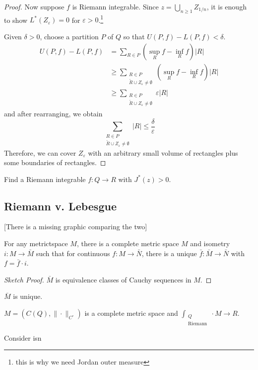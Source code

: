 \begin{proof}
  Now suppose $f$ is Riemann integrable. Since $z = \bigcup_{n \geq 1} Z_{1/n}$, it is enough to show $L^*(Z_\varepsilon) = 0$ for $\varepsilon > 0$.\footnote{this is why we need Jordan outer measure}

  Given $\delta > 0$, choose a partition $P$ of $Q$ so that $U(P,f) - L(P,f) < \delta$.
  \begin{align*}
    U(P,f) - L(P,f) & = \sum_{R \in P} \left( \sup_R f - \inf_R f \right) |R| \\
                    & \geq \sum_{\substack{R \in P \\ \mathring{R} \cup Z_\varepsilon \ne \emptyset}} \left( \sup_R f - \inf_R f \right) |R| \\
                    & \geq \sum_{\substack{R \in P \\ \mathring{R} \cup Z_\varepsilon \ne \emptyset}} \varepsilon |R|
  \end{align*}
  and after rearranging, we obtain
  \[ \sum_{\substack{R \in P \\ \mathring{R} \cup Z_\varepsilon \ne \emptyset}} |R| \leq \frac{\delta}{\varepsilon}\]
  Therefore, we can cover $Z_\varepsilon$ with an arbitrary small volume of rectangles plus some boundaries of rectangles.
\end{proof}

\begin{exercise}
  Find a Riemann integrable $f : Q \to R$ with $J^* (z) > 0$. 
\end{exercise}

\subsection{Riemann v. Lebesgue}

[There is a missing graphic comparing the two]

\begin{theorem}
  For any metrictspace $M$, there is a complete metric space $M$ and isometry $i : M \to \bar{M}$ such that for continuous $f : M \to \bar{N}$, there is a unique $\bar{f} : \bar{M} \to \bar{N}$ with $f = \bar{f} \cdot i$. 
\end{theorem}

\begin{proof}[Sketch Proof]
  $\bar{M}$ is equivalence classes of Cauchy sequences in $M$.
\end{proof}

\begin{corollary}
  $\bar{M}$ is unique. 
\end{corollary}

$M = (C(Q), \| \cdot \|_{C^\circ})$ is a complete metric space and $\int_{\substack{Q \\ \text{Riemann}}} \cdot M \to R$. 

Consider isn



